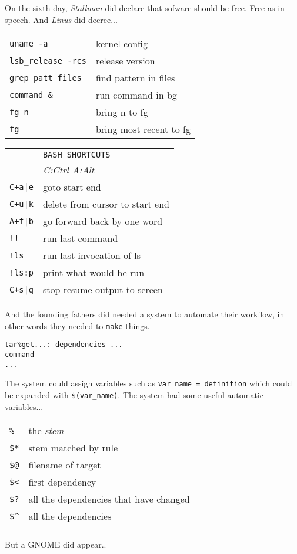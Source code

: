 
On the sixth day, \emph{Stallman} did declare that sofware should be free. Free as in
speech. And \emph{Linus} did decree...

\begin{tabular}{ll}
\texttt{uname -a}& kernel config\\
\texttt{lsb\_release -rcs}& release version\\
\texttt{grep patt files}& find pattern in files\\
\texttt{command \&}& run command in bg\\
\texttt{fg n}& bring n to fg\\
\texttt{fg}& bring most recent to fg\\
\end{tabular}

\vfill
\begin{tabular}{ll}
&\texttt{BASH SHORTCUTS}\\
&\emph{C:Ctrl A:Alt}\\
\texttt{C+a|e}&goto start \textbar{} end\\
\texttt{C+u|k}&delete from cursor to start \textbar{} end\\
\texttt{A+f|b}&go forward \textbar{} back by one word\\
\texttt{!!}&run last command\\
\texttt{!ls}&run last invocation of ls\\
\texttt{!ls:p}&print what would be run\\
\texttt{C+s|q}&stop \textbar{} resume output to screen\\
\end{tabular}
\vfill
And the founding fathers did needed a system to automate their workflow, in
other words they needed to \texttt{make} things.
\bigskip 
\begin{tabbing}
\texttt{tar\%get...}\= \texttt{: dependencies ...}\\
\>\texttt{command}\\
\>\texttt{...}\\
\end{tabbing}
\bigskip
The system could assign variables such as \texttt{var\_name = definition} which
could be expanded with \texttt{\$(var\_name)}.
\bigskip
The system had some useful automatic variables...
\bigskip
\begin{tabular}{ll}
\texttt{\%}&the \emph{stem}\\
\texttt{\$*}&stem matched by rule\\
\texttt{\$@}&filename of target\\
\texttt{\$<}&first dependency\\
\texttt{\$?}&all the dependencies that have changed\\
\texttt{\$\^}&all the dependencies\\
\texttt{}&\\
\end{tabular}
\vfill
But a GNOME did appear..

